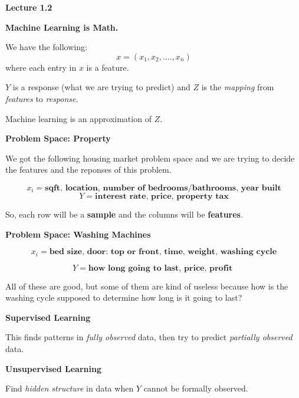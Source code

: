 \documentclass{article}
\begin{document}
\begin{center}

    \Huge \textbf{Lecture 1.2}
    \vspace{0.7cm}
    
\end{center}

\LARGE\textbf{Machine Learning is Math.}
\vspace{0.5cm}

\large We have the following: $$x = (x_1, x_2, ....,x_n)$$ where each entry in $x$ is a feature.



$Y$ is a response (what we are trying to predict) and $Z$ is the \textit{mapping} from \textit{features} to \textit{response}.

\vspace{0.5cm}


Machine learning is an approximation of $Z$.
\vspace{0.5cm}

\LARGE\textbf{Problem Space: Property}
\vspace{0.5cm}

\large We got the following housing market problem space and we are trying to decide the features and the reponses of this problem.

$$x_i = \textbf{sqft, location, number of bedrooms/bathrooms, year built}$$ $$Y = \textbf{interest rate, price, property tax}$$

\vspace{0.5cm}

So, each row will be a \textbf{sample} and the columns will be \textbf{features}.


\vspace{0.5cm}

\LARGE\textbf{Problem Space: Washing Machines}

\large $$x_i = \textbf{bed size, door: top or front, time, weight, washing cycle}$$

$$Y = \textbf{how long going to last, price, profit }$$
\vspace{0.5cm}

\newpage

All of these are good, but some of them are kind of useless because how is the washing cycle supposed to determine how long is it going to last?


\vspace{0.5cm}

\LARGE\textbf{Supervised Learning}

\vspace{0.5cm}

\large This finds patterns in \textit{fully observed} data, then try to predict \textit{partially observed} data.

\vspace{0.5cm}


\LARGE\textbf{Unsupervised Learning}
\vspace{0.5cm}

\large Find \textit{hidden structure} in data when $Y$ cannot be formally observed.

\vspace{0.5cm}
\end{document}
